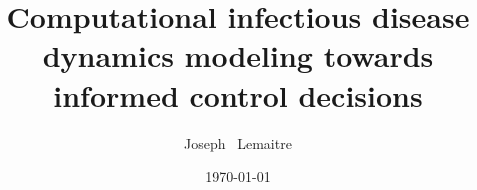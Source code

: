 \documentclass[nohyper,nobib,a4,12pt]{tufte-book} %
\title{Computational infectious disease dynamics modeling towards informed control decisions}
\date{\today}
\author[Joseph Lemaitre]{Joseph \ Lemaitre}
\newcommand{\openepigraph}[2]{%
  \begin{fullwidth}
  \sffamily\large
  \begin{doublespace}
  \noindent\allcaps{#1}\\%
  \noindent\allcaps{#2}%
  \end{doublespace}
  \end{fullwidth}
}
\newcommand{\blankpage}{\newpage\hbox{}\thispagestyle{empty}\newpage}
\begin{document}
	









%





  




%


\begin{fullwidth}
\end{fullwidth}
\end{document}
